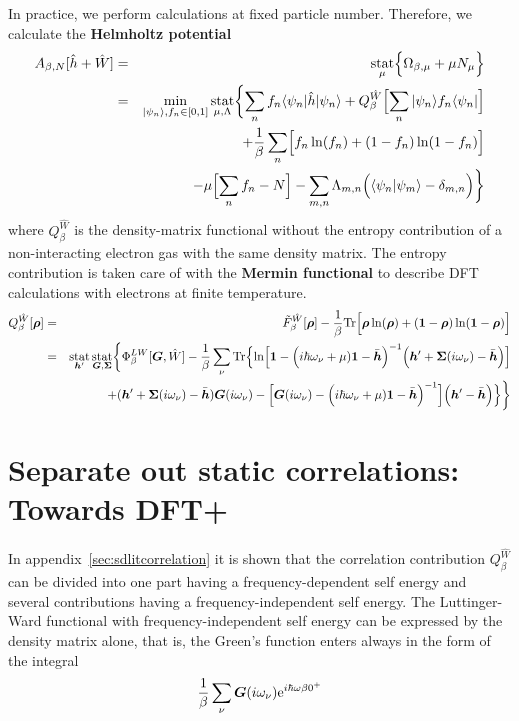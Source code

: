 \documentclass[11pt,a4paper]{report}
\begin{document}
In practice, we perform calculations at fixed particle
number. Therefore, we calculate the \textbf{Helmholtz
  potential}
\begin{eqnarray}
A_{\beta,N}[\hat{h}+\hat{W}]
&=&\operatorname*{stat}_\mu\Bigl\lbrace\Omega_{\beta,\mu}+\mu N_\mu\Bigr\rbrace
\nonumber\\
&=&\min_{|\psi_n\rangle,f_n\in[0,1]}\operatorname*{stat}_{\mu,\Lambda}
\biggl\lbrace\sum_n f_n\langle\psi_n|\hat{h}|\psi_n\rangle
+Q_\beta^{\hat{W}}\Bigl[\sum_n|\psi_n\rangle f_n\langle\psi_n|\Bigr]
\nonumber\\
&&+\frac{1}{\beta}\sum_n\Bigl[f_n\ln(f_n)+(1-f_n)\ln(1-f_n)\Bigr]
\nonumber\\
&&
-\mu\Bigl[\sum_n f_n-N\Bigr]
-\sum_{m,n}\Lambda_{m,n}\Bigl(\langle\psi_n|\psi_m\rangle-\delta_{m,n}\Bigr)
\biggr\rbrace
\label{eq:hp}
\end{eqnarray}
where $Q^{\hat{W}}_\beta$ is the density-matrix functional without the
entropy contribution of a non-interacting electron gas with the same
density matrix.  The entropy contribution is taken care of with the
\textbf{Mermin functional}\cite{mermin65_pr137_a1441} to describe DFT calculations
with electrons at finite temperature.
\begin{eqnarray}
Q^{\hat{W}}_\beta[\bm{\rho}]
&=&\tilde{F}^{\hat{W}}_\beta[\bm{\rho}]
-
\frac{1}{\beta}\mathrm{Tr}\Bigl[
\bm{\rho}\ln(\bm{\rho})+(\bm{1}-\bm{\rho})\ln(\bm{1}-\bm{\rho})\Bigr]
\nonumber\\
&=&
\operatorname*{stat}_{\bm{h}'}\operatorname*{stat}_{\bm{G},\bm{\Sigma}}
\biggl\lbrace
\Phi^{LW}_\beta[\bm{G},\hat{W}]
-\frac{1}{\beta}\sum_\nu\mathrm{Tr}\Bigl\lbrace
\ln\Bigl[
\bm{1}-
\Bigl(i\hbar\omega_\nu+\mu)\bm{1}-\bar{\bm{h}}\Bigr)^{-1}
\Bigl(\bm{h}'+\bm{\Sigma}(i\omega_\nu)-\bar{\bm{h}}\Bigr)
\Bigr]
\nonumber\\&&
+(\bm{h}'+\bm{\Sigma}(i\omega_\nu)-\bar{\bm{h}})\bm{G}(i\omega_\nu)
-
\Bigl[
\bm{G}(i\omega_\nu)
-\Bigl(i\hbar\omega_\nu+\mu)\bm{1}-\bar{\bm{h}}\Bigr)^{-1}
\Bigr]
\Bigl(\bm{h}'-\bar{\bm{h}}\Bigr)\Bigr\rbrace
\biggr\rbrace
\label{eq:dmfQgreen}
\end{eqnarray}

\section{Separate out static correlations: Towards DFT+}
In appendix~\ref{sec:sdlitcorrelation} it is shown that the
correlation contribution $Q^{\hat{W}}_\beta$ can be divided into
one part having a frequency-dependent self energy and several
contributions having a frequency-independent self energy. The
Luttinger-Ward functional with frequency-independent self energy can
be expressed by the density matrix alone, that is, the Green's function
enters always in the form of the integral
\begin{eqnarray}
\frac{1}{\beta}\sum_\nu\bm{G}(i\omega_\nu)\mathrm{e}^{i\hbar\omega\beta0^+}
\end{eqnarray}
\end{document}
